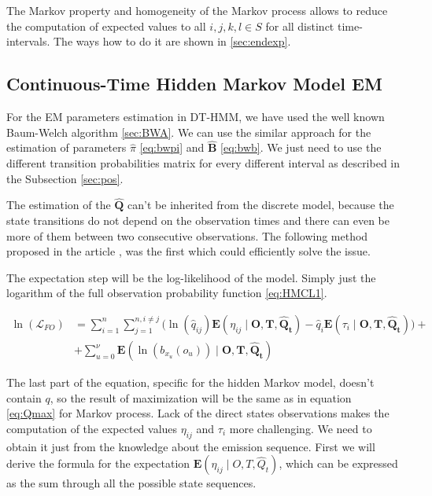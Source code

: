 \documentclass[thesis=M,english]{FITthesis}[2012/10/20]
\newcommand{\matr}[1]{\mathbf{#1}}
\begin{document}
The Markov property and homogeneity of the Markov process allows to reduce the computation of expected values to all $i,j,k,l \in S$ for all distinct time-intervals. The ways how to do it are shown in \ref{sec:endexp}.     
   
\subsection{Continuous-Time Hidden Markov Model EM}\label{sec:CBWA}

For the EM parameters estimation in DT-HMM, we have used the well known Baum-Welch algorithm \ref{sec:BWA}. We can use the similar approach for the estimation of parameters $\hat \pi$ \eqref{eq:bwpi} and $\matr{ \hat B }$ \eqref{eq:bwb}. We just need to use the different transition probabilities matrix for every different interval as described in the Subsection \ref{sec:pos}.  

The estimation of the $\matr{ \hat Q }$ can't be inherited from the discrete model, because the state transitions do not depend on the observation times and there can even be more of them between two consecutive observations. The following method proposed in the article \cite{Li15}, was the first which could efficiently solve the issue.        

The expectation step will be the log-likelihood of the model. Simply just the logarithm of the full observation probability function \eqref{eq:HMCL1}.

\begin{equation}\label{eq:EMCTHMM}
\begin{aligned}  
 \ln(\mathcal{L}_{FO}) &= \sum_{i=1}^{n} \sum_{j=1}^{n, i \neq j} \big( \ln( \hat q_{ij}) \mathbf{E}( \eta_{ij} \mid \matr{O},\matr{T}, \matr{ \hat Q_t } ) - \hat q_i \mathbf{E}( \tau_i \mid \matr{O},\matr{T}, \matr{ \hat Q_t } ) \big) + \\
    &+ \sum_{u=0}^{\nu} \mathbf{E}( \ln( b_{ x_u }(o_u) ) \mid \matr{O},\matr{T},\matr{\hat Q_t} )
\end{aligned}
\end{equation}

The last part of the equation, specific for the hidden Markov model, doesn't contain $q$, so the result of maximization will be the same as in equation \eqref{eq:Qmax} for Markov process. Lack of the direct states observations makes the computation of the expected values $\eta_{ij}$ and $\tau_i$ more challenging. We need to obtain it just from the knowledge about the emission sequence. First we will derive the formula for the expectation $\mathbf{E}(\eta_{ij} \mid O,T, \hat Q_t )$, which can be expressed as the sum through all the possible state sequences.
\end{document}
